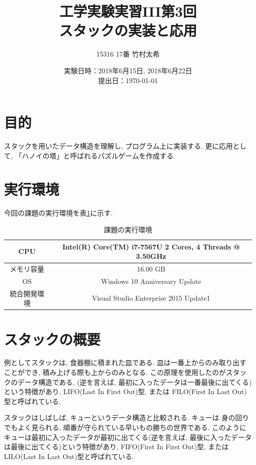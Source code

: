 \documentclass[a4j]{jsarticle}
\title {工学実験実習III第3回\\スタックの実装と応用}
\author {15316 17番 竹村太希}
\date{実験日時：2018年6月15日, 2018年6月22日
\\ 提出日：\today}
\begin{document}
\maketitle
\thispagestyle{empty}
\newpage
\setcounter{page}{1}
\pagestyle{plain}

\section{目的}
    スタックを用いたデータ構造を理解し, プログラム上に実装する. 
    更に応用として, 「ハノイの塔」と呼ばれるパズルゲームを作成する. 


\section{実行環境}
今回の課題の実行環境を表\ref{t-1}に示す. 

\begin{table}[htbp]
\centering
\caption{課題の実行環境}
\label{t-1}
\begin{tabular}{|c||c|}
\hline
 CPU & Intel(R) Core(TM) i7-7567U 2 Cores, 4 Threads @ 3.50GHz \\
\hline
 メモリ容量 & 16.00 GB \\
\hline
 OS & Windows 10 Anniversary Update \\
\hline
 統合開発環境 & Visual Studio Enterprise 2015 Update1\\
\hline
\end{tabular}
\end{table}

\section{スタックの概要}
    例としてスタックは, 食器棚に積まれた皿である.  皿は一番上からのみ取り出すことができ, 積み上げる際も上からのみとなる. 
    この原理を使用したのがスタックのデータ構造である. 
    (逆を言えば, 最初に入ったデータは一番最後に出てくる)という特徴があり, LIFO(Last In First Out)型, または
    FILO(First In Last Out)型と呼ばれている. 

    スタックはしばしば, キューというデータ構造と比較される. キューは
    身の回りでもよく見られる, 順番が守られている早いもの勝ちの世界である. 
    このようにキューは最初に入ったデータが最初に出てくる(逆を言えば, 最後に入ったデータは最後に出てくる)という特徴があり, 
    FIFO(First In First Out)型, またはLILO(Last In Last Out)型と呼ばれている. 
    
\end{document}

